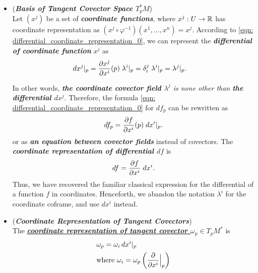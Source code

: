 \documentclass[11pt]{article}
\begin{document}
\begin{itemize}
\item \begin{remark}  (\emph{\textbf{Basis of Tangent Covector Space $T_p^{*}M$}})\\
Let  $(x^j)$ be a set of  \emph{\textbf{coordinate functions}}, where $x^{j}: U \rightarrow {\mathbb R}$ has coordinate representation as $(x^{j} \circ \varphi^{-1})(x^1, \ldots, x^{n}) = x^{j}$. According to \eqref{eqn: differential_coordinate_representation_0}, we can represent the \emph{\textbf{differential of coordinate function}} $x^{j}$ as 
\begin{align*}
d x^{j} |_p  &= \frac{\partial x^{j}}{ \partial x^{i}}(p) \; \lambda^i |_p = \delta_{i}^{j}\; \lambda^i |_p =  \lambda^j |_p.
\end{align*}

In other words, \emph{\textbf{the coordinate covector field $\lambda^j$} is none other than \textbf{the differential $dx^j$}}. Therefore, the formula \eqref{eqn: differential_coordinate_representation_0} for $df_p$ can be rewritten as
\begin{align}
df_p = \frac{\partial f}{ \partial x^{i}}(p) \; d x^{i} |_p.   \label{eqn: differential_coordinate_representation_1}
\end{align} or as \emph{\textbf{an equation between covector fields}} instead of covectors. The \emph{\textbf{coordinate representation of differential $df$}} is
\begin{align}
df = \frac{\partial f}{ \partial x^{i}} \; d x^{i}.   \label{eqn: differential_coordinate_representation}
\end{align} Thus, we have recovered the familiar classical expression for the differential of a
function $f$ in coordinates. Henceforth, we abandon the notation $\lambda^i$ for the coordinate coframe, and use $dx^i$ instead. 
\end{remark}

\item \begin{remark} (\emph{\textbf{Coordinate Representation of Tangent Covectors}})\\
The \underline{\emph{\textbf{coordinate representation of tangent covector $\omega_{p} \in T_pM^{*}$}}} is
\begin{align}
&\omega_{p} = \omega_i\, dx^i |_p \label{eqn: covector_field_coordinate_representation} \\
&\text{where }  \omega_i = \omega_p\left(\frac{\partial }{ \partial x^{i}}\Bigr|_{p}\right) \nonumber
\end{align}
\end{remark}


\end{itemize}
\end{document}
